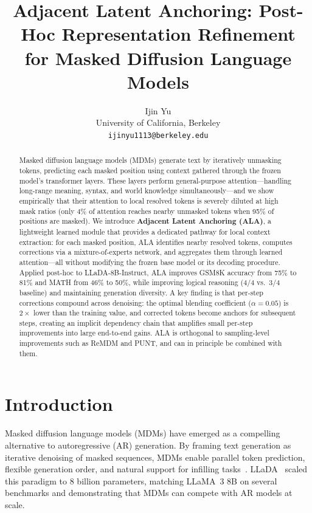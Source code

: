 \documentclass{article} %
\title{Adjacent Latent Anchoring: Post-Hoc Representation Refinement\\for Masked Diffusion Language Models}
\author{
Ijin Yu \\
University of California, Berkeley \\
\texttt{ijinyu1113@berkeley.edu}
}
\begin{document}
\ifcolmsubmission
\linenumbers
\fi

\maketitle

\begin{abstract}
Masked diffusion language models (MDMs) generate text by iteratively unmasking tokens, predicting each masked position using context gathered through the frozen model's transformer layers.
These layers perform general-purpose attention---handling long-range meaning, syntax, and world knowledge simultaneously---and we show empirically that their attention to local resolved tokens is severely diluted at high mask ratios (only 4\% of attention reaches nearby unmasked tokens when 95\% of positions are masked).
We introduce \textbf{Adjacent Latent Anchoring (ALA)}, a lightweight learned module that provides a dedicated pathway for local context extraction: for each masked position, ALA identifies nearby resolved tokens, computes corrections via a mixture-of-experts network, and aggregates them through learned attention---all without modifying the frozen base model or its decoding procedure.
Applied post-hoc to LLaDA-8B-Instruct, ALA improves GSM8K accuracy from 75\% to 81\% and MATH from 46\% to 50\%, while improving logical reasoning (4/4 vs.\ 3/4 baseline) and maintaining generation diversity.
A key finding is that per-step corrections compound across denoising: the optimal blending coefficient ($\alpha{=}0.05$) is $2\times$ lower than the training value, and corrected tokens become anchors for subsequent steps, creating an implicit dependency chain that amplifies small per-step improvements into large end-to-end gains.
ALA is orthogonal to sampling-level improvements such as ReMDM and PUNT, and can in principle be combined with them.
\end{abstract}


\section{Introduction}
\label{sec:intro}

Masked diffusion language models (MDMs) have emerged as a compelling alternative to autoregressive (AR) generation.
By framing text generation as iterative denoising of masked sequences, MDMs enable parallel token prediction, flexible generation order, and natural support for infilling tasks~\citep{austin2021structured, sahoo2024simple, nie2025llada}.
LLaDA~\citep{nie2025llada} scaled this paradigm to 8 billion parameters, matching LLaMA~3 8B on several benchmarks and demonstrating that MDMs can compete with AR models at scale.
\end{document}
